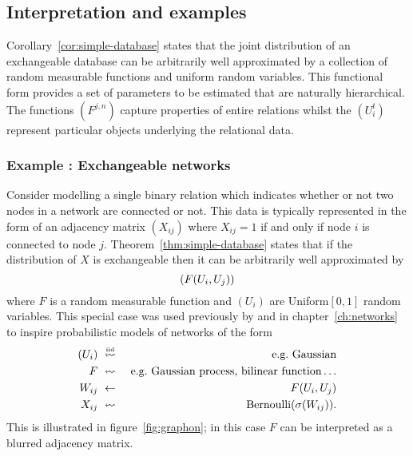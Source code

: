 \subsection{Interpretation and examples}

Corollary~\ref{cor:simple-database} states that the joint distribution of an exchangeable database can be arbitrarily well approximated by a collection of random measurable functions and uniform random variables.
This functional form provides a set of parameters to be estimated that are naturally hierarchical.
The functions $(F^{j,n})$ capture properties of entire relations whilst the $(U^t_i)$ represent particular objects underlying the relational data.

\subsubsection{Example : Exchangeable networks}

Consider modelling a single binary relation which indicates whether or not two nodes in a network are connected or not.
This data is typically represented in the form of an adjacency matrix $(X_{ij})$ where $X_{ij} = 1$ if and only if node $i$ is connected to node $j$.
Theorem~\ref{thm:simple-database} states that if the distribution of $X$ is exchangeable then it can be arbitrarily well approximated by
\begin{equation}
(F(U_i, U_j))
\end{equation}
where $F$ is a random measurable function and $(U_i)$ are \iid Uniform$[0,1]$ random variables.%
This special case was used previously by \cite{Hoff2007-ja,Roy2009-ge,Lloyd2012-sb} and in chapter~\ref{ch:networks} to inspire probabilistic models of networks of the form
\begin{eqnarray}
(\AHvar_i) & \probgetsiid & \textrm{\eg Gaussian} \\
F & \probgets & \textrm{\eg Gaussian process, bilinear function}\ldots \\
W_{ij} & \deterministicgets & F(\AHvar_i, \AHvar_j) \\
X_{ij} & \probgets & \textrm{Bernoulli}(\sigma(W_{ij}))\label{eq:graphon}.
\end{eqnarray}
This is illustrated in figure~\ref{fig:graphon}; in this case $F$ can be interpreted as a blurred adjacency matrix.



